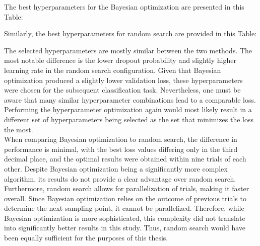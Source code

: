 The best hyperparameters for the Bayesian optimization are presented in this Table:


Similarly, the best hyperparameters for random search are provided in this Table:


The selected hyperparameters are mostly similar between the two methods. The most notable difference is the lower dropout probability and slightly higher learning rate in the random
search configuration. Given that Bayesian optimization produced a slightly lower validation loss, these hyperparameters were chosen for the subsequent classification task. 
Nevertheless, one must be aware that many similar hyperparameter combinations lead to a comparable loss. Performing the hyperparameter optimization again would most likely result in a different set of hyperparameters being selected as the 
set that minimizes the loss the most. \\

When comparing Bayesian optimization to random search, the difference in performance is minimal, with the best loss values differing only in the third decimal place, and the optimal results were obtained
within nine trials of each other. Despite Bayesian optimization being a significantly more complex algorithm, its results do not provide a clear advantage over random search. Furthermore, random search allows
for parallelization of trials, making it faster overall. Since Bayesian optimization relies on the outcome of previous trials to determine the next sampling point, it cannot be parallelized.
Therefore, while Bayesian optimization is more sophisticated, this complexity did not translate into significantly better results in this study. Thus, random search would have been equally sufficient for
the purposes of this thesis.

